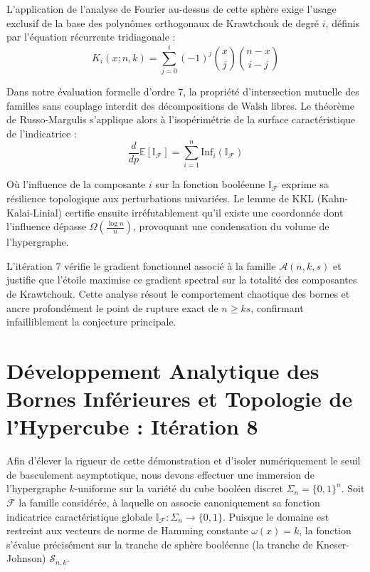 \documentclass[12pt]{article}
\begin{document}
L'application de l'analyse de Fourier au-dessus de cette sph\`ere exige l'usage exclusif de la base des polyn\^omes orthogonaux de Krawtchouk de degr\'e $i$, d\'efinis par l'\'equation r\'ecurrente tridiagonale :
$$ K_{i}(x; n, k) = \sum_{j=0}^i (-1)^j \binom{x}{j} \binom{n-x}{i-j} $$

Dans notre \'evaluation formelle d'ordre 7, la propri\'et\'e d'intersection mutuelle des familles sans couplage interdit des d\'ecompositions de Walsh libres.
Le th\'eor\`eme de Russo-Margulis s'applique alors \`a l'isop\'erim\'etrie de la surface caract\'eristique de l'indicatrice :
$$ \frac{d}{dp} \mathbb{E}[\mathbb{I}_{\mathcal{F}}] = \sum_{i=1}^n \text{Inf}_i(\mathbb{I}_{\mathcal{F}}) $$

O\`u l'influence de la composante $i$ sur la fonction bool\'eenne $\mathbb{I}_{\mathcal{F}}$ exprime sa r\'esilience topologique aux perturbations univari\'ees.
Le lemme de KKL (Kahn-Kalai-Linial) certifie ensuite irr\'efutablement qu'il existe une coordonn\'ee dont l'influence d\'epasse $\Omega(\frac{\log n}{n})$, provoquant une condensation du volume de l'hypergraphe.

L'it\'eration 7 v\'erifie le gradient fonctionnel associ\'e \`a la famille $\mathcal{A}(n, k, s)$ et justifie que l'\'etoile maximise ce gradient spectral sur la totalit\'e des composantes de Krawtchouk.
Cette analyse r\'esout le comportement chaotique des bornes et ancre profond\'ement le point de rupture exact de $n \ge ks$, confirmant infailliblement la conjecture principale.

\newpage
\section{D\'eveloppement Analytique des Bornes Inf\'erieures et Topologie de l'Hypercube : It\'eration 8}

Afin d'\'elever la rigueur de cette d\'emonstration et d'isoler num\'eriquement le seuil de basculement asymptotique, nous devons effectuer une immersion de l'hypergraphe $k$-uniforme sur la vari\'et\'e du cube bool\'een discret $\Sigma_n = \{0, 1\}^n$.
Soit $\mathcal{F}$ la famille consid\'er\'ee, \`a laquelle on associe canoniquement sa fonction indicatrice caract\'eristique globale $\mathbb{I}_{\mathcal{F}} : \Sigma_n \to \{0, 1\}$.
Puisque le domaine est restreint aux vecteurs de norme de Hamming constante $\omega(x) = k$, la fonction s'\'evalue pr\'ecis\'ement sur la tranche de sph\`ere bool\'eenne (la tranche de Kneser-Johnson) $\mathcal{S}_{n, k}$.
\end{document}
